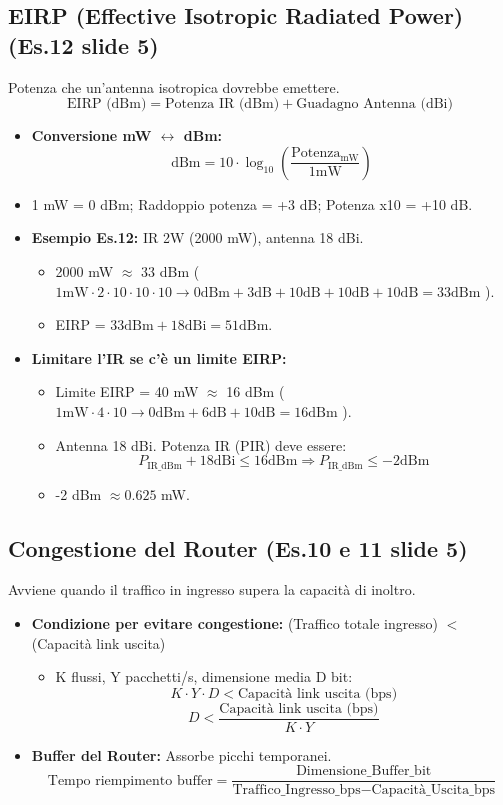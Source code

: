 \subsection{EIRP (Effective Isotropic Radiated Power) (Es.12 slide 5)}
Potenza che un'antenna isotropica dovrebbe emettere.
\[ \text{EIRP (dBm)} = \text{Potenza IR (dBm)} + \text{Guadagno Antenna (dBi)} \]
\begin{itemize}
    \item \textbf{Conversione mW $\leftrightarrow$ dBm:}
    \[ \text{dBm} = 10 \cdot \log_{10} \left( \frac{\text{Potenza}_{\text{mW}}}{1\text{mW}} \right) \]
    \item 1 mW = 0 dBm; Raddoppio potenza = +3 dB; Potenza x10 = +10 dB.
    \item \textbf{Esempio Es.12:} IR 2W (2000 mW), antenna 18 dBi.
    \begin{itemize}
        \item 2000 mW $\approx$ 33 dBm ( $1\text{mW} \cdot 2 \cdot 10 \cdot 10 \cdot 10 \rightarrow 0\text{dBm} + 3\text{dB} + 10\text{dB} + 10\text{dB} + 10\text{dB} = 33\text{dBm}$ ).
        \item EIRP = $33\text{dBm} + 18\text{dBi} = 51\text{dBm}$.
    \end{itemize}
    \item \textbf{Limitare l'IR se c'è un limite EIRP:}
    \begin{itemize}
        \item Limite EIRP = 40 mW $\approx$ 16 dBm ( $1\text{mW} \cdot 4 \cdot 10 \rightarrow 0\text{dBm} + 6\text{dB} + 10\text{dB} = 16\text{dBm}$ ).
        \item Antenna 18 dBi. Potenza IR (P\textunderscore IR) deve essere:
        \[ P_{\text{IR\_dBm}} + 18\text{dBi} \le 16\text{dBm} \Rightarrow P_{\text{IR\_dBm}} \le -2\text{dBm} \]
        \item -2 dBm $\approx 0.625$ mW.
    \end{itemize}
\end{itemize}

\subsection{Congestione del Router (Es.10 e 11 slide 5)}
Avviene quando il traffico in ingresso supera la capacità di inoltro.
\begin{itemize}
    \item \textbf{Condizione per evitare congestione:} (Traffico totale ingresso) $<$ (Capacità link uscita)
    \begin{itemize}
        \item K flussi, Y pacchetti/s, dimensione media D bit:
        \[ K \cdot Y \cdot D < \text{Capacità link uscita (bps)} \]
        \[ D < \frac{\text{Capacità link uscita (bps)}}{K \cdot Y} \]
    \end{itemize}
    \item \textbf{Buffer del Router:} Assorbe picchi temporanei.
    \[ \text{Tempo riempimento buffer} = \frac{\text{Dimensione\_Buffer\_bit}}{\text{Traffico\_Ingresso\_bps} - \text{Capacità\_Uscita\_bps}} \]
\end{itemize}

